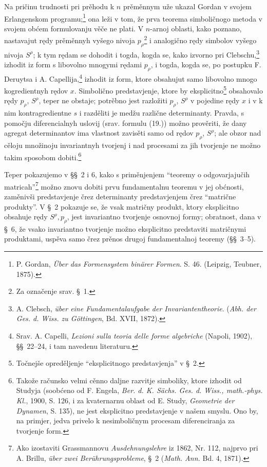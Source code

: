 \documentclass[11pt]{article}
\begin{document}
Na pričinu trudnosti pri prěhodu k $n$ prěměnnym uže ukazal Gordan v svojem Erlangenskom programu;\footnote{P. Gordan, \emph{Über das Formensystem binärer Formen}. S. 46. (Leipzig, Teubner, 1875).} ona leži v tom, že prva teorema simboličnogo metoda v svojem obćem formulovanju věče ne plati. V $n$-arnoj oblasti, kako poznano, nastavajut rędy prěměnnyh vyšego nivoja $p_\rho$\footnote{Za označenje srav. \S\ 1.} i analogično rędy simbolov vyšego nivoja $S^\rho$; k tym rędam se dohodit i togda, kogda se, kako izvorno pri Clebschu,\footnote{A. Clebsch, \emph{über eine Fundamentalaufgabe der Invariantentheorie}. (\emph{Abh. der Ges. d. Wiss. zu Göttingen}, Bd. XVII, 1872).} izhodit iz form s libovolno mnogymi rędami $p_\rho$, i togda, kogda se, po postupku F. Deruytsa i A. Capellija,\footnote{Srav. A. Capelli, \emph{Lezioni sulla teoria delle forme algebriche} (Napoli, 1902), \S\S\ 22--24, i tam navedenu literaturu.} izhodit iz form, ktore obsahujut samo libovolno mnogo kogredientnyh rędov $x$. Simbolično predstavjenje, ktore by eksplicitno\footnote{Točnejše opreděljenje ``eksplicitnogo predstavjenja'' v \S\ 2.} obsahovalo rędy $p_\rho$, $S^\rho$, teper ne obstaje; potrěbno jest razložiti $p_\rho$, $S^\rho$ v pojedine rędy $x$ i v k nim kontragredientne $s$ i razděliti je medžu različne determinanty. Pravda, s pomočju diferencialnyh uslovij (srav. formulu (19.)) možno prověriti, že dany agregat determinantov ima vlastnost zavisěti samo od rędov $p_\rho$, $S^\rho$; ale obzor nad cěloju množinoju invariantnyh tvorjenj i nad procesami za jih tvorjenje ne možno takim sposobom dobiti.\footnote{Takože računsko velmi cěnno daljne razvitje simboliky, ktore izhodit od Studyja (soobćeno od F. Engela, \emph{Ber. d. K. Sächs. Ges. d. Wiss., math.-phys. Kl.}, 1900, S. 126, i za kvaternarnu oblast od E. Study, \emph{Geometrie der Dynamen}, S. 135), ne jest eksplicitno predstavjenje v našem smyslu. Ono by, na primjer, jedva privelo k nesimboličnym procesam diferenciranja za tvorjenje form.}

Teper pokazujemo v \S\S\ 2 i 6, kako s priměnjenjem ``teoremy o odgovarjajučih matricah''\footnote{Ako izostaviti Grassmannovu \emph{Ausdehnungslehre} iz 1862, Nr. 112, najprvo pri A. Brillu, \emph{über zwei Berührungsprobleme}, \S\ 2 (\emph{Math. Ann.} Bd. 4, 1871).} možno znovu dobiti prvu fundamentalnu teoremu v jej obćnosti, zaměnivši predstavjenje črez determinanty predstavjenjem črez ``matrične produkty''. V \S\ 2 pokazuje se, že vsak matričny produkt, ktory eksplicitno obsahuje rędy $S^\rho,p_\rho$, jest invariantno tvorjenje osnovnoj formy; obratnost, dana v \S\ 6, že vsako invariantno tvorjenje možno eksplicitno predstaviti matričnymi produktami, uspěva samo črez prěnos drugoj fundamentalnoj teoremy (\S\S\ 3--5).
\end{document}
